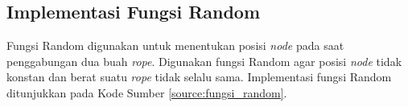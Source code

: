 


\subsection{Implementasi Fungsi Random}
Fungsi Random digunakan untuk menentukan posisi \textit{node} pada saat penggabungan dua buah \textit{rope}. Digunakan fungsi Random agar posisi \textit{node} tidak konstan dan berat suatu \textit{rope} tidak selalu sama. Implementasi fungsi Random ditunjukkan pada Kode Sumber \ref{source:fungsi_random}.



